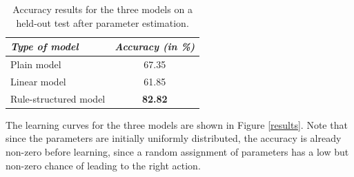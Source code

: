 \begin{table}[h]
\begin{center}
\begin{tabular}{|l|c|} \hline
\textit{Type of model} & \textit{Accuracy (in \%) } \\ \hline \hline
Plain model & 67.35 \\ \hline
Linear model & 61.85 \\ \hline
Rule-structured model & \textbf{82.82} \\ \hline
\end{tabular}
\end{center}
\vspace{-2mm}
\caption{Accuracy results for the three models on a held-out test after parameter estimation.}
\vspace{-2mm}
\label{table}
\end{table}

The learning curves for the three models are shown in Figure \ref{results}.   Note that since the parameters are initially uniformly distributed, the accuracy is already non-zero before learning, since a random assignment of parameters has a low but non-zero chance of leading to the right action. 


